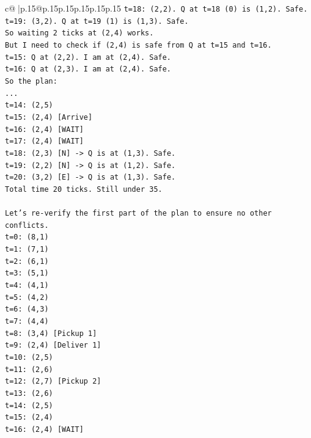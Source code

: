 \documentclass{article}
\begin{document}
{\begin{supertabular}{c@{$\;$}|p{.15\linewidth}@{}p{.15\linewidth}p{.15\linewidth}p{.15\linewidth}p{.15\linewidth}p{.15\linewidth}}
{{{\texttt{t=18: (2,2). Q at t=18 (0) is (1,2). Safe.} \\
\texttt{t=19: (3,2). Q at t=19 (1) is (1,3). Safe.} \\
\texttt{So waiting 2 ticks at (2,4) works.} \\
\texttt{But I need to check if (2,4) is safe from Q at t=15 and t=16.} \\
\texttt{t=15: Q at (2,2). I am at (2,4). Safe.} \\
\texttt{t=16: Q at (2,3). I am at (2,4). Safe.} \\
\texttt{So the plan:} \\
\texttt{...} \\
\texttt{t=14: (2,5)} \\
\texttt{t=15: (2,4) {[}Arrive{]}} \\
\texttt{t=16: (2,4) {[}WAIT{]}} \\
\texttt{t=17: (2,4) {[}WAIT{]}} \\
\texttt{t=18: (2,3) {[}N{]} {-}> Q is at (1,3). Safe.} \\
\texttt{t=19: (2,2) {[}N{]} {-}> Q is at (1,2). Safe.} \\
\texttt{t=20: (3,2) {[}E{]} {-}> Q is at (1,3). Safe.} \\
\texttt{Total time 20 ticks. Still under 35.} \\
\\ 
\texttt{Let's re{-}verify the first part of the plan to ensure no other conflicts.} \\
\texttt{t=0: (8,1)} \\
\texttt{t=1: (7,1)} \\
\texttt{t=2: (6,1)} \\
\texttt{t=3: (5,1)} \\
\texttt{t=4: (4,1)} \\
\texttt{t=5: (4,2)} \\
\texttt{t=6: (4,3)} \\
\texttt{t=7: (4,4)} \\
\texttt{t=8: (3,4) {[}Pickup 1{]}} \\
\texttt{t=9: (2,4) {[}Deliver 1{]}} \\
\texttt{t=10: (2,5)} \\
\texttt{t=11: (2,6)} \\
\texttt{t=12: (2,7) {[}Pickup 2{]}} \\
\texttt{t=13: (2,6)} \\
\texttt{t=14: (2,5)} \\
\texttt{t=15: (2,4)} \\
\texttt{t=16: (2,4) {[}WAIT{]}} \\
}}}
\end{supertabular}}
\end{document}
